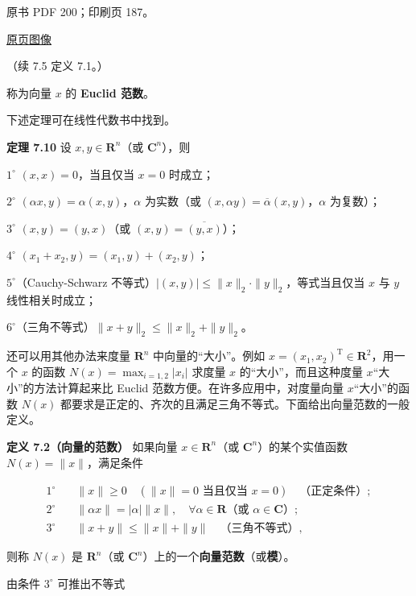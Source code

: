 \documentclass[
  10pt,
  fontset=fandol]{ctexart}
\begin{document}
\clearpage

原书 PDF 200；印刷页 187。

\href{/Users/xiangjunfeng/Desktop/数值计算专用/numerical-analysis/book/source-images/pdf-200.jpeg}{原页图像}

（续 7.5 定义 7.1。）

称为向量 \(x\) 的 \textbf{Euclid 范数}。

下述定理可在线性代数书中找到。

\textbf{定理 7.10} 设 \(x,y\in\mathbf R^n\)（或 \(\mathbf C^n\)），则

\(1^\circ\) \((x,x)=0\)，当且仅当 \(x=0\) 时成立；

\(2^\circ\) \((\alpha x,y)=\alpha(x,y)\)，\(\alpha\) 为实数（或
\((x,\alpha y)=\overline\alpha(x,y)\)，\(\alpha\) 为复数）；

\(3^\circ\) \((x,y)=(y,x)\)（或 \((x,y)=\overline{(y,x)}\)）；

\(4^\circ\) \((x_1+x_2,y)=(x_1,y)+(x_2,y)\)；

\(5^\circ\)（Cauchy-Schwarz
不等式）\(|(x,y)|\leqslant\|x\|_2\cdot\|y\|_2\)，等式当且仅当 \(x\) 与
\(y\) 线性相关时成立；

\(6^\circ\)（三角不等式）\(\|x+y\|_2\leqslant\|x\|_2+\|y\|_2\)。

还可以用其他办法来度量 \(\mathbf R^n\) 中向量的``大小''。例如
\(x=(x_1,x_2)^{\mathrm T}\in\mathbf R^2\)，用一个 \(x\) 的函数
\(N(x)=\max_{i=1,2}|x_i|\) 求度量 \(x\) 的``大小''，而且这种度量
\(x\)``大小''的方法计算起来比 Euclid 范数方便。在许多应用中，对度量向量
\(x\)``大小''的函数 \(N(x)\)
都要求是正定的、齐次的且满足三角不等式。下面给出向量范数的一般定义。

\textbf{定义 7.2（向量的范数）} 如果向量 \(x\in\mathbf R^n\)（或
\(\mathbf C^n\)）的某个实值函数 \(N(x)=\|x\|\)，满足条件

\[
\begin{aligned}
1^\circ\quad &\|x\|\geqslant0\quad(\|x\|=0\text{ 当且仅当 }x=0)\quad\text{（正定条件）};\\
2^\circ\quad &\|\alpha x\|=|\alpha|\|x\|,\quad\forall\alpha\in\mathbf R\text{（或 }\alpha\in\mathbf C\text{）};\\
3^\circ\quad &\|x+y\|\leqslant\|x\|+\|y\|\quad\text{（三角不等式）},
\end{aligned}
\tag{7.5.1}
\]

则称 \(N(x)\) 是 \(\mathbf R^n\)（或
\(\mathbf C^n\)）上的一个\textbf{向量范数}（或\textbf{模}）。

由条件 \(3^\circ\) 可推出不等式
\end{document}
